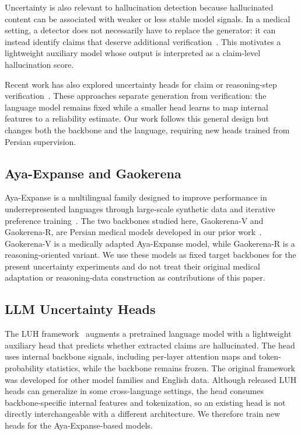\documentclass[conference]{IEEEtran}
\begin{document}
Uncertainty is also relevant to hallucination detection because hallucinated content can be associated with weaker or less stable model signals. In a medical setting, a detector does not necessarily have to replace the generator: it can instead identify claims that deserve additional verification~\cite{b5,b6}. This motivates a lightweight auxiliary model whose output is interpreted as a claim-level hallucination score.

Recent work has also explored uncertainty heads for claim or reasoning-step verification~\cite{b8}. These approaches separate generation from verification: the language model remains fixed while a smaller head learns to map internal features to a reliability estimate. Our work follows this general design but changes both the backbone and the language, requiring new heads trained from Persian supervision.

\subsection{Aya-Expanse and Gaokerena}

Aya-Expanse is a multilingual family designed to improve performance in underrepresented languages through large-scale synthetic data and iterative preference training~\cite{b1,b3,b4}. The two backbones studied here, Gaokerena-V and Gaokerena-R, are Persian medical models developed in our prior work~\cite{b11,b12}. Gaokerena-V is a medically adapted Aya-Expanse model, while Gaokerena-R is a reasoning-oriented variant. We use these models as fixed target backbones for the present uncertainty experiments and do not treat their original medical adaptation or reasoning-data construction as contributions of this paper.

\subsection{LLM Uncertainty Heads}

The LUH framework~\cite{b14} augments a pretrained language model with a lightweight auxiliary head that predicts whether extracted claims are hallucinated. The head uses internal backbone signals, including per-layer attention maps and token-probability statistics, while the backbone remains frozen. The original framework was developed for other model families and English data. Although released LUH heads can generalize in some cross-language settings, the head consumes backbone-specific internal features and tokenization, so an existing head is not directly interchangeable with a different architecture. We therefore train new heads for the Aya-Expanse-based models.
\end{document}

